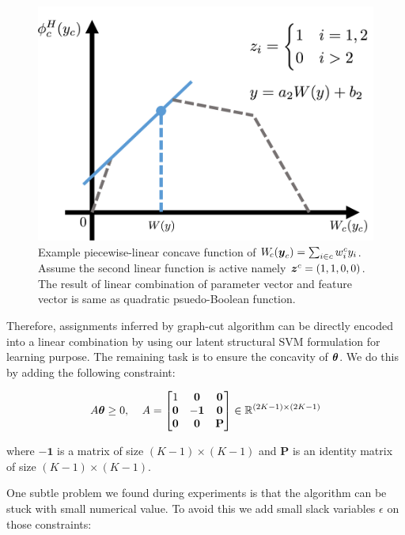 \documentclass[sigconf, anonymous, review]{acmart}
\begin{document}
\begin{figure}[t]
  \centering
  \includegraphics[width=0.8\columnwidth]{Methodology/figures/linEnvLatentFig.png}
  \caption{\label{fig:concave} Example piecewise-linear concave
    function of $W_{\!c}({\boldsymbol{y}}_c) = \sum_{i \in c} w^c_i y_i$.
    Assume the second linear function is active namely
    ${\boldsymbol{z}}^c=(1,1,0,0)$. The result of linear combination of
    parameter vector and feature vector is same as quadratic
    psuedo-Boolean function.}
\end{figure}

Therefore, assignments inferred by graph-cut algorithm can be
directly encoded into a linear combination by using our latent
structural SVM formulation for learning purpose. The remaining
task is to ensure the concavity of $\boldsymbol{\theta}$. We do this by
adding the following constraint:

\begin{align}
  A\boldsymbol{\theta}\geq0 \text{,\;~~~} A=
                  \begin{bmatrix}
                    1 & \mathbf{0} & \mathbf{0}\\
                    \mathbf{0} & -\mathbf{1} & \mathbf{0}\\
                    \mathbf{0} & \mathbf{0} & \mathbf{P}
                  \end{bmatrix}\in \mathbb{R}^{(2K-1)\times(2K-1)}
\end{align}

\noindent where $-\mathbf{1}$ is a matrix of size $(K-1)\times(K-1)$ and
$\mathbf{P}$ is an identity matrix of size $(K-1)\times(K-1)$.

One subtle problem we found during experiments is that the
algorithm can be stuck with small numerical value. To avoid this
we add small slack variables $\epsilon$ on those constraints:
\end{document}
